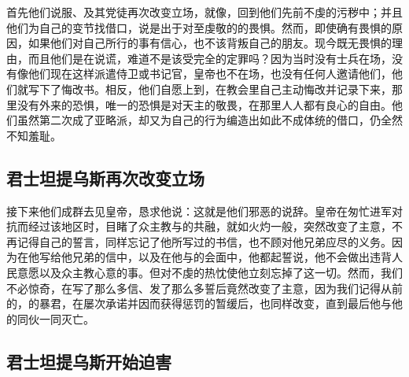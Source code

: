 首先他们说服、及其党徒再次改变立场，就像，回到他们先前不虔的污秽中；并且他们为自己的变节找借口，说是出于对至虔敬的的畏惧。然而，即使确有畏惧的原因，如果他们对自己所行的事有信心，也不该背叛自己的朋友。现今既无畏惧的理由，而且他们是在说谎，难道不是该受完全的定罪吗？因为当时没有士兵在场，没有像他们现在这样派遣侍卫或书记官，皇帝也不在场，也没有任何人邀请他们，他们就写下了悔改书。相反，他们自愿上到，在教会里自己主动悔改并记录下来，那里没有外来的恐惧，唯一的恐惧是对天主的敬畏，在那里人人都有良心的自由。他们虽然第二次成了亚略派，却又为自己的行为编造出如此不成体统的借口，仍全然不知羞耻。\par


\subsection{君士坦提乌斯再次改变立场}

接下来他们成群去见皇帝，恳求他说：这就是他们邪恶的说辞。皇帝在匆忙进军对抗而经过该地区时，目睹了众主教与的共融，就如火灼一般，突然改变了主意，不再记得自己的誓言，同样忘记了他所写过的书信，也不顾对他兄弟应尽的义务。因为在他写给他兄弟的信中，以及在他与的会面中，他都起誓说，他不会做出违背人民意愿以及众主教心意的事。但对不虔的热忱使他立刻忘掉了这一切。然而，我们不必惊奇，在写了那么多信、发了那么多誓后竟然改变了主意，因为我们记得从前的，的暴君，在屡次承诺并因而获得惩罚的暂缓后，也同样改变，直到最后他与他的同伙一同灭亡。\par


\subsection{君士坦提乌斯开始迫害}

